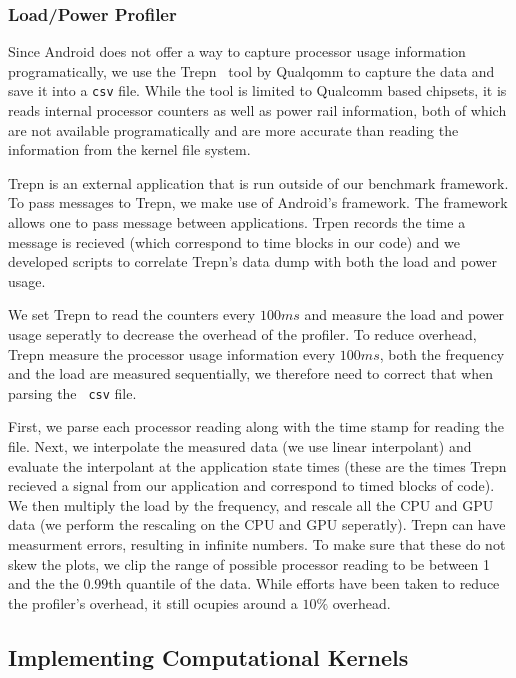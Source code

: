 \subsubsection{Load/Power Profiler}

Since Android does not offer a way to capture processor usage information
programatically, we use the Trepn~\cite{profilerqualcomm} tool by Qualqomm to capture the data and save it into a {\tt csv} file.  
While the tool is limited to Qualcomm based
chipsets, it is reads internal processor counters as well as power rail information,
both of which are not available programatically and are more accurate than reading
the information from the  kernel file system.

Trepn is an external application that is run outside of our benchmark framework.
To pass messages to Trepn, we make use of Android's  framework.
The  framework allows one to pass message between applications.
Trpen records the time a message is recieved (which correspond to time blocks
in our code) and we developed scripts to correlate Trepn's data dump with both
the load and power usage.

We set Trepn to read
the counters every $100ms$ and measure the load and power usage seperatly to
decrease the overhead of the profiler.  To reduce overhead, Trepn measure the
processor usage information every $100ms$, both the frequency and the load are
measured sequentially, we therefore need to correct that when parsing the {\tt
csv} file.

First, we parse each processor reading along with the time stamp for reading the
file.  Next, we interpolate the measured data (we use linear interpolant) and
evaluate the interpolant at the application state times (these are the times
Trepn recieved a signal from our application and correspond to timed blocks of
code).  We then multiply the load by the frequency, and rescale all the CPU and
GPU data (we perform the rescaling on the CPU and GPU seperatly).  Trepn can
have measurment errors, resulting in infinite numbers.  To make sure that these
do not skew the plots, we clip the range of possible processor reading to be
between 1 and the the $0.99$th quantile of the data.  While efforts have
been taken to reduce the profiler's overhead, it still ocupies around a
$10\%$ overhead.


\subsection{Implementing Computational Kernels}
\label{sec:implementationRS}

